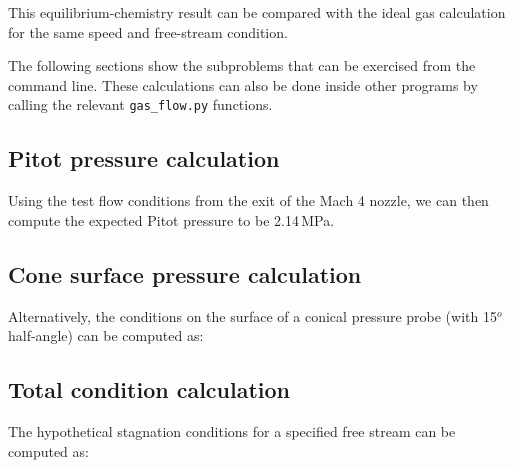 \documentclass[landscape,12pt,a4paper]{article}
\begin{document}


This equilibrium-chemistry result can be compared with the ideal gas calculation 
for the same speed and free-stream condition.



\medskip
The following sections show the subproblems that can be exercised from the command line.
These calculations can also be done inside other programs by calling 
the relevant \verb?gas_flow.py? functions.

\bigskip
\subsection{Pitot pressure calculation}
%
Using the test flow conditions from the exit of the Mach 4 nozzle, we can then
compute the expected Pitot pressure to be 2.14\,MPa.



\bigskip
\subsection{Cone surface pressure calculation}
%
Alternatively, the conditions on the surface of a conical pressure probe
(with 15$^o$ half-angle) can be computed as:



\bigskip
\subsection{Total condition calculation}
%
The hypothetical stagnation conditions for a specified free stream
can be computed as:



\newpage
\end{document}
